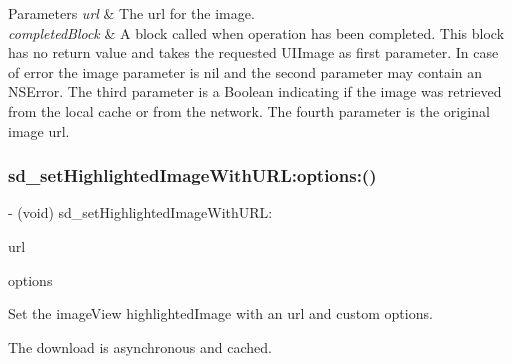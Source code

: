 \begin{DoxyParams}{Parameters}
{\em url} & The url for the image. \\
\hline
{\em completed\+Block} & A block called when operation has been completed. This block has no return value and takes the requested U\+I\+Image as first parameter. In case of error the image parameter is nil and the second parameter may contain an N\+S\+Error. The third parameter is a Boolean indicating if the image was retrieved from the local cache or from the network. The fourth parameter is the original image url. \\
\hline
\end{DoxyParams}
\mbox{\label{category_u_i_image_view_07_highlighted_web_cache_08_a6280a94232644970a918aa0c0eebb008}} 
\subsubsection{\texorpdfstring{sd\+\_\+set\+Highlighted\+Image\+With\+U\+R\+L\+:options\+:()}{sd\_setHighlightedImageWithURL:options:()}\hspace{0.1cm}{\footnotesize\ttfamily [1/3]}}
{\footnotesize\ttfamily -\/ (void) sd\+\_\+set\+Highlighted\+Image\+With\+U\+R\+L\+: \begin{DoxyParamCaption}\item[{(N\+S\+U\+RL $\ast$)}]{url }\item[{options:(S\+D\+Web\+Image\+Options)}]{options }\end{DoxyParamCaption}}

Set the image\+View {\ttfamily highlighted\+Image} with an {\ttfamily url} and custom options.

The download is asynchronous and cached.


